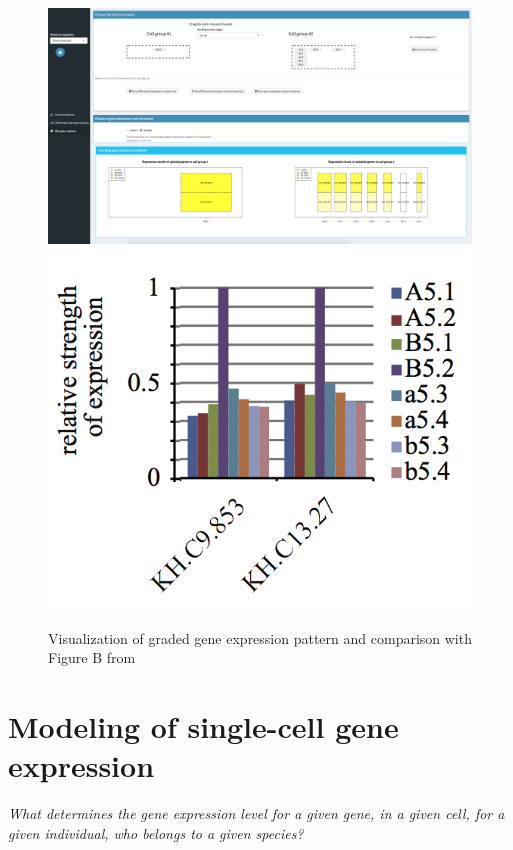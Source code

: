 \documentclass{report}
\begin{document}
{\begin{figure}[H]
\centering
\subfigure\includegraphics[scale=0.2]{application/gradedthres.png}
\subfigure\includegraphics[scale=0.5]{application/figureDchordate.png}
\caption{Visualization of graded gene expression pattern and comparison with Figure B from \cite{matsuoka2013transcriptome}}
\label{graded}
\end{figure}

\chapter{Modeling of single-cell gene expression}

\textit{What determines the gene expression level for a given gene, in a given cell, for a given individual, who belongs to a given species?}\\

}
\end{document}
